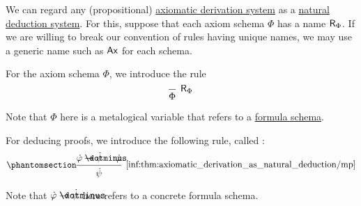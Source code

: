 \begin{remark}\label{rem:axiomatic_derivation_system_as_natural_deduction_system}
  We can regard any (propositional) \hyperref[def:axiomatic_derivation_system]{axiomatic derivation system} as a \hyperref[def:abstract_natural_deduction_system]{natural deduction system}. For this, suppose that each axiom schema \( \Phi \) has a name \( \textsf{R}_\Phi \). If we are willing to break our convention of rules having unique names, we may use a generic name such as \( \textsf{Ax} \) for each schema.

  \begin{thmenum}
     For the axiom schema \( \Phi \), we introduce the rule
    \begin{equation*}
      \begin{prooftree}
        \infer0[\ensuremath{ \logic{R}_\Phi }]{ \Phi }
      \end{prooftree}
    \end{equation*}

    Note that \( \Phi \) here is a metalogical variable that refers to a \hyperref[def:propositional_formula_schema]{formula schema}.

     For deducing proofs, we introduce the following rule, called :
    \begin{equation*}\taglabel[\ensuremath{ \logic{MP} }]{inf:thm:axiomatic_derivation_as_natural_deduction/mp}
      \begin{prooftree}
        \hypo{ \syn\varphi \synimplies \syn\psi }
        \hypo{ \syn\varphi }
        \infer2[\ref{inf:thm:axiomatic_derivation_as_natural_deduction/mp}]{ \syn\psi }
      \end{prooftree}
    \end{equation*}

    Note that \( \syn\varphi \synimplies \syn\psi \) here refers to a concrete formula schema.
  \end{thmenum}
\end{remark}

